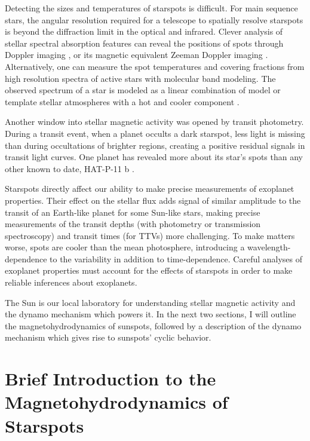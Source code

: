 Detecting the sizes and temperatures of starspots is difficult. For main sequence stars, the angular resolution required for a telescope to spatially resolve starspots is beyond the diffraction limit in the optical and infrared. Clever analysis of stellar spectral absorption features can reveal the positions of spots through Doppler imaging \citep{Vogt1983,Barnes2001,Strassmeier2002}, or its magnetic equivalent Zeeman Doppler imaging \citep{Donati2003,Morin2008,Morin2010,Morin2011,Morin2013}. Alternatively, one can measure the spot temperatures and covering fractions from high resolution spectra of active stars with molecular band modeling. The observed spectrum of a star is modeled as a linear combination of model or template stellar atmospheres with a hot and cooler component \citep{Neff1995,oneal1996,oneal1998,ONeal2004}. 

Another window into stellar magnetic activity was opened by \kepler transit photometry. During a transit event, when a planet occults a dark starspot, less light is missing than during occultations of brighter regions, creating a positive residual signals in transit light curves. One planet has revealed more about its star's spots than any other known to date, HAT-P-11 b \citep{Bakos2010,Winn2010,Deming2011,Sanchis-Ojeda2011,Hirano2011}. 

Starspots directly affect our ability to make precise measurements of exoplanet properties. Their effect on the stellar flux adds signal of similar amplitude to the transit of an Earth-like planet for some Sun-like stars, making precise measurements of the transit depths (with photometry or transmission spectroscopy) and transit times (for TTVs) more challenging. To make matters worse, spots are cooler than the mean photosphere, introducing a wavelength-dependence to the variability in addition to time-dependence. Careful analyses of exoplanet properties must account for the effects of starspots in order to make reliable inferences about exoplanets. 

The Sun is our local laboratory for understanding stellar magnetic activity and the dynamo mechanism which powers it. In the next two sections, I will outline the magnetohydrodynamics of sunspots, followed by a description of the dynamo mechanism which gives rise to sunspots' cyclic behavior.  

\section{Brief Introduction to the Magnetohydrodynamics of Starspots}

